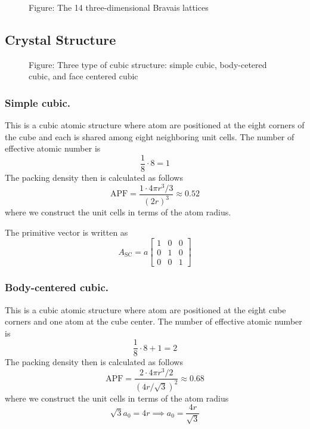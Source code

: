 \documentclass[../../../main.tex]{subfiles}
\begin{document}
\begin{figure}[]
    \centering
    \caption*{Figure: The 14 three-dimensional Bravais lattices}
\end{figure}

\subsection{Crystal Structure}
\begin{figure}[]
    \centering
    \caption*{Figure: Three type of cubic structure: simple cubic, body-cetered cubic, and face centered cubic}
\end{figure}

\subsubsection{Simple cubic.}
This is a cubic atomic structure where atom are positioned at the eight corners of the cube and each is shared among eight neighboring unit cells.
The number of effective atomic number is
\begin{equation*}
    \frac{1 }{8 }\cdot 8=1
\end{equation*}
The packing density then is calculated as follows
\begin{equation*}
    \text{APF}=\frac{1 \cdot 4 \pi r^3/3 }{(2r)^3}\approx 0.52
\end{equation*}
where we construct the unit cells in terms of the atom radius.

The primitive vector is written as
\begin{equation*}
    A_{\text{SC}} = a
    \begin{bmatrix}
        1 & 0 & 0 \\
        0 & 1 & 0 \\
        0 & 0 & 1
    \end{bmatrix}
\end{equation*}

\subsubsection{Body-centered cubic.}
This is a cubic atomic structure where atom are positioned at the eight cube corners and one atom at the cube center.
The number of effective atomic number is
\begin{equation*}
    \frac{1 }{8 }\cdot 8+1=2
\end{equation*}
The packing density then is calculated as follows
\begin{equation*}
    \text{APF}=\frac{2 \cdot 4\pi r^3/2 }{(4r/\sqrt{3})^2}\approx 0.68
\end{equation*}
where we construct the unit cells in terms of the atom radius
\begin{equation*}
    \sqrt{3} a_0=4r \implies a_0=\frac{4r }{\sqrt{3}}
\end{equation*}
\end{document}
